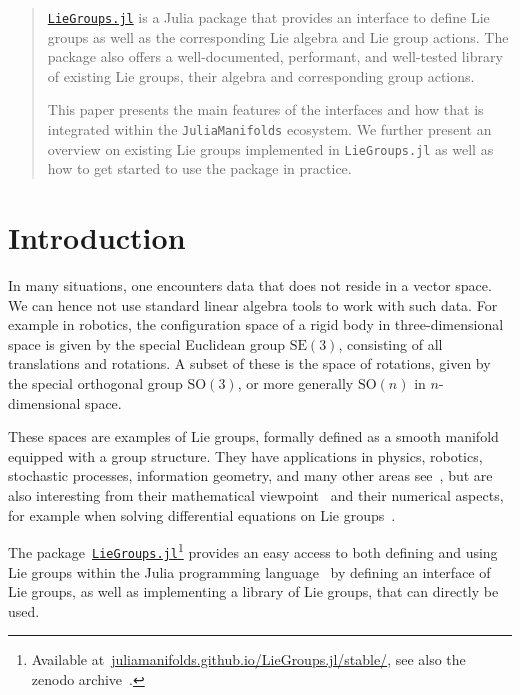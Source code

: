 \documentclass{juliacon}
\begin{document}

\maketitle

\begin{abstract}
    \href{https://juliamanifolds.github.io/LieGroups.jl/stable/}{\texttt{LieGroups.jl}} is a
    Julia package that provides an interface to define Lie groups as well as the corresponding Lie algebra and Lie group actions. The package also offers a well-documented, performant, and well-tested library of existing Lie groups, their algebra and corresponding group actions.

    This paper presents the main features of the interfaces and how that is integrated within
    the \verb|JuliaManifolds| ecosystem. We further present an overview on existing Lie groups
    implemented in \verb|LieGroups.jl| as well as how to get started to use the package in practice.
\end{abstract}
%
\section{Introduction}%
\label{sec:Introduction}
%
In many situations, one encounters data that does not reside in a vector space.
We can hence not use standard linear algebra tools to work with such data.
For example in robotics, the configuration space of a rigid body in three-dimensional
space is given by the special Euclidean group \(\mathrm{SE}(3)\),
consisting of all translations and rotations.
A subset of these is the space of rotations, given by the special orthogonal group \(\mathrm{SO}(3)\),
or more generally \(\mathrm{SO}(n)\) in \(n\)-dimensional space.

These spaces are examples of Lie groups, formally defined as a smooth manifold equipped with a group structure.
They have applications in physics, robotics, stochastic processes, information geometry, and many other areas see~\cite{Chirikjian:2009,Chirikjian:2012},
but are also interesting from their mathematical viewpoint~\cite{HilgertNeeb:2012}
and their numerical aspects, for example when solving differential equations on Lie groups~\cite{Munthe-Kaas:1998}.

The package~\href{https://juliamanifolds.github.io/LieGroups.jl/stable/}{\texttt{LieGroups.jl}}\footnote{%
Available at~\href{https://juliamanifolds.github.io/LieGroups.jl/stable/}{juliamanifolds.github.io/LieGroups.jl/stable/},
see also the zenodo archive~\cite{LieGroups.jl}.%
}
provides an easy access to both defining and using Lie groups within
the Julia programming language~\cite{bezanson2017julia} by defining an interface of Lie groups, as well as implementing a library of Lie groups, that can directly be used.
\end{document}
